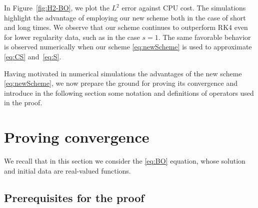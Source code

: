 \documentclass [11pt] {article}
\begin{document}
In Figure~\ref{fig:H2-BO}, we plot the $L^2$ error against CPU cost. The simulations highlight the advantage of employing our new scheme both in the case of short and long times.
We observe that our scheme continues to outperform RK4 even for lower regularity data, such as in the case $s = 1$.
The same favorable behavior is observed numerically when our scheme \eqref{eq:newScheme} is used to approximate \eqref{eq:CS} and~\eqref{eq:S}.

Having motivated in numerical simulations the advantages of the new scheme \eqref{eq:newScheme}, we now prepare the ground for proving its convergence and introduce in the following section some notation and definitions of operators used in the proof.


\section{Proving convergence}

We recall that in this section we consider the \eqref{eq:BO} equation, whose solution and initial data are real-valued functions.

\subsection{Prerequisites for the proof}\label{sec:ops}
\end{document}
